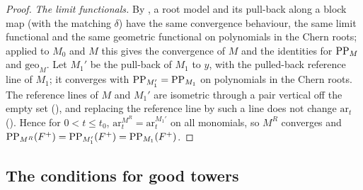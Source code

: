 \begin{proof}
\emph{The limit functionals.} By , a root model and its
pull-back along a block map (with the matching $\delta$) have the same convergence behaviour, the same limit
functional and the same geometric functional on polynomials in the Chern roots; applied to $M_0$ and $M$ this gives
the convergence of $M$ and the identities for $\mathrm{PP}_M$ and $\mathrm{geo}_M$. Let $M_1'$ be the pull-back of $M_1$
to $y$, with the pulled-back reference line of $M_1$; it converges with $\mathrm{PP}_{M_1'}=\mathrm{PP}_{M_1}$ on
polynomials in the Chern roots. The reference lines of $M$ and $M_1'$ are isometric through a pair vertical off the
empty set (), and replacing the reference line by such a
line does not change $\mathrm{ar}_t$ (). Hence for
$0<t\le t_0$, $\mathrm{ar}^{M^R}_t=\mathrm{ar}^{M_1'}_t$ on all monomials, so $M^R$ converges and
$\mathrm{PP}_{M^R}(F^+)=\mathrm{PP}_{M_1'}(F^+)=\mathrm{PP}_{M_1}(F^+)$.
\end{proof}

\subsection{The conditions for good towers}\label{pf:volthm:sec:conditions}

